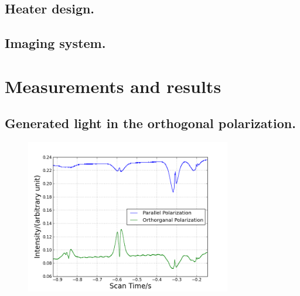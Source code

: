 \documentclass[aps,twocolumn,secnumarabic,balancelastpage,amsmath,amssymb,nofootinbib]{revtex4}
\begin{document}
\subsection{Heater design.}
\subsection{Imaging system.}

\section{Measurements and results}
\subsection{Generated light in the orthogonal polarization.}
\begin{figure}
  \includegraphics[width=9cm]{../data/5-16_csv/intensities.png}
  \caption{}
  \label{intensities}
\end{figure}
\end{document}
